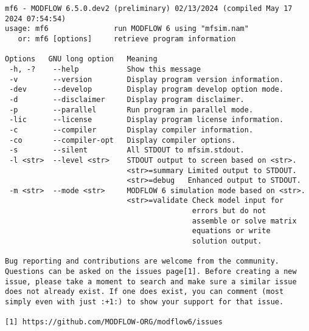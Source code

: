 {\small
\begin{lstlisting}[style=modeloutput]
mf6 - MODFLOW 6.5.0.dev2 (preliminary) 02/13/2024 (compiled May 17 2024 07:54:54)
usage: mf6               run MODFLOW 6 using "mfsim.nam"
   or: mf6 [options]     retrieve program information

Options   GNU long option   Meaning 
 -h, -?    --help           Show this message
 -v        --version        Display program version information.
 -dev      --develop        Display program develop option mode.
 -d        --disclaimer     Display program disclaimer.
 -p        --parallel       Run program in parallel mode.
 -lic      --license        Display program license information.
 -c        --compiler       Display compiler information.
 -co       --compiler-opt   Display compiler options.
 -s        --silent         All STDOUT to mfsim.stdout.
 -l <str>  --level <str>    STDOUT output to screen based on <str>.
                            <str>=summary Limited output to STDOUT.
                            <str>=debug   Enhanced output to STDOUT.
 -m <str>  --mode <str>     MODFLOW 6 simulation mode based on <str>.
                            <str>=validate Check model input for
                                           errors but do not 
                                           assemble or solve matrix 
                                           equations or write 
                                           solution output.
                                                                    
Bug reporting and contributions are welcome from the community. 
Questions can be asked on the issues page[1]. Before creating a new
issue, please take a moment to search and make sure a similar issue
does not already exist. If one does exist, you can comment (most
simply even with just :+1:) to show your support for that issue.
                                                                    
[1] https://github.com/MODFLOW-ORG/modflow6/issues
\end{lstlisting}
}
